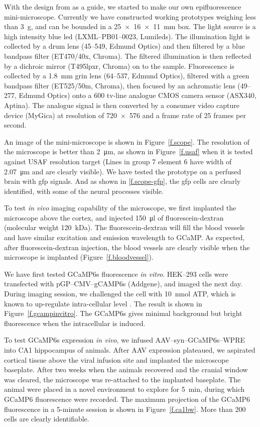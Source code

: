 With the design from \citet{ghosh11} as a guide, we started to make our own epifluorescence mini-microscope. Currently we have constructed working prototypes weighing less than \SI{3}{\g}, and can be bounded in a \SI{25 x 16 x 11}{\mm} box. The light source is a high intensity blue \gls{led} (LXML--PB01--0023, Lumileds). The illumination light is collected by a drum lens (45--549, Edmund Optics) and then filtered by a blue bandpass filter (ET470/40x, Chroma). The filtered illumination is then reflected by a dichroic mirror (T495lpxr, Chroma) on to the sample. Fluorescence is collected by a \SI{1.8}{\mm} \gls{grin} lens (64--537, Edmund Optics), filtered with a green bandpass filter (ET525/50m, Chroma), then focused by an achromatic lens (49--277, Edmund Optics) onto a 600 tv-line analogue CMOS camera sensor (ASX340, Aptina). The analogue signal is then converted by a consumer video capture device (MyGica) at resolution of \num{720 x 576} and a frame rate of 25 frames per second.

An image of the mini-microscope is shown in Figure~\ref{f.scope}. The resolution of the microscope is better than \SI{2}{\um}, as shown in Figure~\ref{f.usaf} when it is tested against USAF resolution target (Lines in group 7 element 6 have width of \SI{2.07}{\um} and are clearly visible). We have tested the prototype on a perfused brain with \gls{gfp} signals. And as shown in \ref{f.scope-gfp}, the \gls{gfp} cells are clearly identified, with some of the neural processes visible.

To test \textit{in vivo} imaging capability of the microscope, we first implanted the microscope above the cortex, and injected \SI{150}{\ul} of fluorescein-dextran (molecular weight \SI{120}{\kilo\dalton}). The fluorescein-dextran will fill the blood vessels and have similar excitation and emission wavelength to GCaMP. As expected, after fluorescein-dextran injection, the blood vessels are clearly visible when the microscope is implanted (Figure~\ref{f.bloodvessel}).

We have first tested GCaMP6s fluorescence \textit{in vitro}. HEK--293 cells were transfected with pGP--CMV--gCAMP6s (Addgene), and imaged the next day. During imaging session, we challenged the cell with \SI{10}{\nmol} ATP, which is known to up-regulate intra-cellular  level \citep[\textit{e.g.}][]{lee04}. The result is shown in Figure~\ref{f.gcampinvitro}. The GCaMP6s gives minimal background but bright fluorescence when the intracellular  is induced.
    
To test GCaMP6s expression \textit{in vivo}, we infused AAV--syn--GCaMP6s--WPRE into CA1 hippocampus of animals. After AAV expression plateaued, we aspirated cortical tissue above the viral infusion site and implanted the microscope baseplate. After two weeks when the animals recovered and the cranial window was cleared, the microscope was re-attached to the implanted baseplate. The animal were placed in a novel environment to explore for \SI{5}{\minute}, during which GCaMP6 fluorescence were recorded. The maximum projection of the GCaMP6 fluorescence in a 5-minute session is shown in Figure~\ref{f.ca1bw}. More than 200 cells are clearly identifiable.

